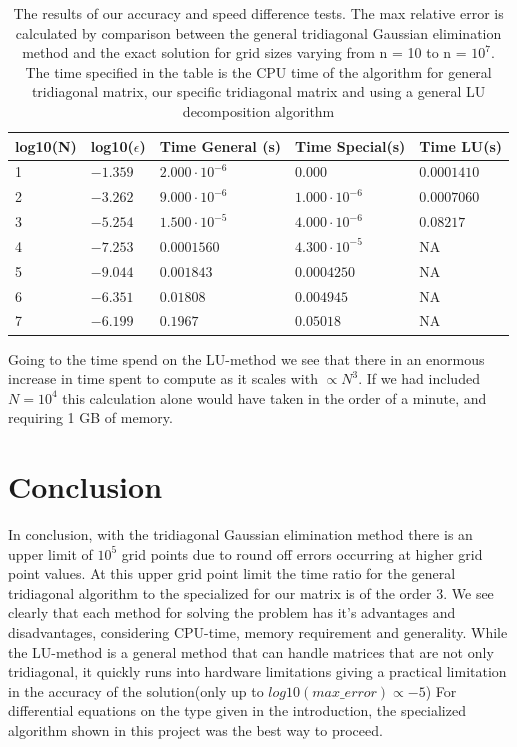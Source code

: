 \documentclass[a4paper,11pt]{article}
\begin{document}
{\begin{table}[H]
	\centering
	\caption{The results of our accuracy and speed difference tests. The max relative error is calculated by comparison between the general tridiagonal Gaussian elimination method and the exact solution for grid sizes varying from n = 10 to n = $10^{7}$. The time specified in the table is the CPU time of the algorithm for general tridiagonal matrix, our specific tridiagonal matrix and using a general LU decomposition algorithm}
	\label{table:Results}
	\begin{tabular}{|lllll|} \hline
		log10(N) & log10($\epsilon$) & Time General (s)     & Time Special(s)      & Time LU(s) \\
		\hline 
		1        & $-1.359$       &$2.000\cdot 10^{-6}$  &$0.000$              &  $0.0001410$    \\
		2        & $-3.262$       &$9.000\cdot 10^{-6}$  &$1.000\cdot 10^{-6}$ &  $0.0007060$        \\
		3        & $-5.254$       &$1.500\cdot 10^{-5}$  &$4.000\cdot 10^{-6}$ &  $0.08217$      \\
		4        & $-7.253$       &$0.0001560$ 	         &$4.300\cdot 10^{-5}$ &   NA       \\
		5        & $-9.044$       &$0.001843$	         &$0.0004250$	       &   NA       \\
		6        & $-6.351$       &$0.01808$	         &$0.004945$	       &   NA       \\
		7 	     & $-6.199$		  &$0.1967$ 		     &$0.05018$ 		   &   NA \\
		\hline
	\end{tabular}
\end{table}


		
		
Going to the time spend on the LU-method we see that there in an enormous increase in time spent to compute as it scales with $\propto N^3$. If we had included $N=10^4$ this calculation alone would have taken in the order of a minute, and requiring 1 GB of memory. 

\section*{Conclusion}
		
In conclusion, with the tridiagonal Gaussian elimination method there is an upper limit of $10^{5}$ grid points due to round off errors occurring at higher grid point values. At this upper grid point limit the time ratio for the general tridiagonal algorithm to the specialized for our matrix is of the order 3. We see clearly that each method for solving the problem has it's advantages and disadvantages, considering CPU-time, memory requirement and generality. While the LU-method is a general method that can handle matrices that are not only tridiagonal, it quickly runs into hardware limitations giving a practical limitation in the accuracy of the solution(only up to $log10(max\_error)\propto -5$) For differential equations on the type given in the introduction, the specialized algorithm shown in this project was the best way to proceed. 
		
}
\end{document}

